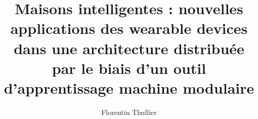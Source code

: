 \documentclass[12pt,times,these,french]{uqac}
\begin{document}
\title{Maisons intelligentes : nouvelles applications des wearable devices dans une architecture distribuée par le biais d'un outil d'apprentissage machine modulaire}


\author{Florentin Thullier}

\maketitle

\opening


\tableofcontents
\listoftables
\listoffigures
\listofacro


%

\maincontent













\appendix


\end{document}
